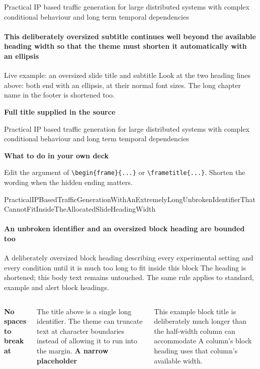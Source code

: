 \documentclass[aspectratio=169,10pt]{beamer}
\begin{document}
\begin{frame}{Practical IP based traffic generation for large distributed systems with complex conditional behaviour and long term temporal dependencies}
  \framesubtitle{This deliberately oversized subtitle continues well beyond the available heading width so that the theme must shorten it automatically with an ellipsis}
  \begin{block}{Live example: an oversized slide title and subtitle}
    Look at the two heading lines above: both end with an ellipsis, at their normal font sizes. The long chapter name in the footer is shortened too.
  \end{block}
  \medskip
  \textbf{Full title supplied in the source}\par\smallskip
  {\small\color{DASEslate}Practical IP based traffic generation for large distributed systems with complex conditional behaviour and long term temporal dependencies}
  \par\medskip
  \textbf{What to do in your own deck}\par\smallskip
  \small Edit the argument of \texttt{\textbackslash begin\{frame\}\{...\}} or \texttt{\textbackslash frametitle\{...\}}. Shorten the wording when the hidden ending matters.
\end{frame}

\begin{frame}{PracticalIPBasedTrafficGenerationWithAnExtremelyLongUnbrokenIdentifierThatCannotFitInsideTheAllocatedSlideHeadingWidth}
  \framesubtitle{An unbroken identifier and an oversized block heading are bounded too}
  \begin{block}{A deliberately oversized block heading describing every experimental setting and every condition until it is much too long to fit inside this block}
    The heading is shortened; this body text remains untouched. The same rule applies to standard, example and alert block headings.
  \end{block}
  \medskip
  \begin{columns}[T,onlytextwidth]
      \textbf{No spaces to break at}\par\smallskip
      \small The title above is a single long identifier. The theme can truncate text at character boundaries instead of allowing it to run into the margin.
      \textbf{A narrow placeholder}\par\smallskip
      \begin{exampleblock}{This example block title is deliberately much longer than the half-width column can accommodate}
        A column's block heading uses that column's available width.
      \end{exampleblock}
  \end{columns}
\end{frame}
\end{document}
